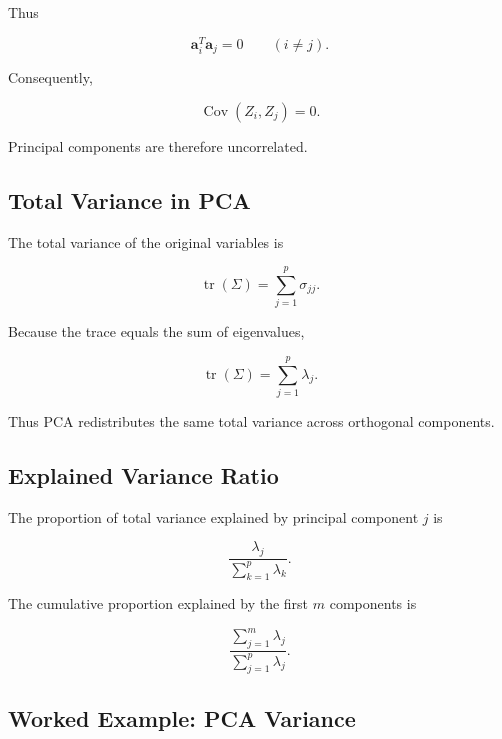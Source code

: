Thus

\[
\boxed{
\mathbf{a}_i^T
\mathbf{a}_j
=
0
\qquad
(i\neq j).
}
\]

Consequently,

\[
\boxed{
\operatorname{Cov}(Z_i,Z_j)=0.
}
\]

Principal components are therefore uncorrelated.

\subsection{Total Variance in PCA}
\label{subsec:pca-total-variance}

The total variance of the original variables is

\[
\boxed{
\operatorname{tr}(\Sigma)
=
\sum_{j=1}^{p}\sigma_{jj}.
}
\]

Because the trace equals the sum of eigenvalues,

\[
\boxed{
\operatorname{tr}(\Sigma)
=
\sum_{j=1}^{p}\lambda_j.
}
\]

Thus PCA redistributes the same total variance across orthogonal
components.

\subsection{Explained Variance Ratio}
\label{subsec:pca-explained-variance}

The proportion of total variance explained by principal component \(j\)
is

\[
\boxed{
\frac{
\lambda_j
}{
\sum_{k=1}^{p}\lambda_k
}.
}
\]

The cumulative proportion explained by the first \(m\) components is

\[
\boxed{
\frac{
\sum_{j=1}^{m}\lambda_j
}{
\sum_{j=1}^{p}\lambda_j
}.
}
\]

\subsection{Worked Example: PCA Variance}
\label{subsec:worked-pca-variance}

